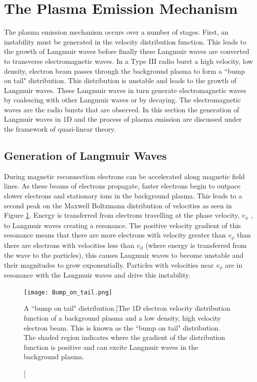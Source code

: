 \section{The Plasma Emission Mechanism}
\label{sec:plasma_emission}
The plasma emission mechanism occurs over a number of stages. First, an instability must be generated in the velocity distribution function. This leads to the growth of Langmuir waves before finally these Langmuir waves are converted to transverse electromagnetic waves. In a Type III radio burst a high velocity, low density, electron beam passes through the background plasma to form a ``bump on tail" distribution. This distribution is unstable and leads to the growth of Langmuir waves. These Langmuir waves in turn generate electromagnetic waves by coalescing with other Langmuir waves or by decaying. The electromagnetic waves are the radio bursts that are observed. In this section the generation of Langmuir waves in 1D and the process of plasma emission are discussed under the framework of quasi-linear theory.

\subsection{Generation of Langmuir Waves}
During magnetic reconnection electrons can be accelerated along magnetic field lines. As these beams of electrons propagate, faster electrons begin to outpace slower electrons and stationary ions in the background plasma. This leads to a second peak on the Maxwell Boltzmann distribution of velocities as seen in Figure \ref{fig:bumpontail}. Energy is transferred from electrons travelling at the phase velocity, $v_{\phi}$ , to Langmuir waves creating a resonance.
The positive velocity gradient of this resonance means that there are more electrons with velocity greater than $v_{\phi}$ than there are electrons with velocities less than  $v_{\phi}$ (where energy is transferred from the wave to the particles), this causes Langmuir waves to become unstable and their magnitudes to grow exponentially. Particles with velocities near $v_{\phi}$ are in resonance with the Langmuir waves and drive this instability.

\begin{figure}[ht]
\centering
\texttt{[image: Bump\_on\_tail.png]}
\caption[A ``bump on tail" distribution.]{The 1D electron velocity distribution function of a background plasma and a low density, high velocity electron beam. This is known as the ``bump on tail" distribution. The shaded region indicates where the gradient of the distribution function is positive and can excite Langmuir waves in the background plasma.}
\label{fig:bumpontail}
\end{figure}


